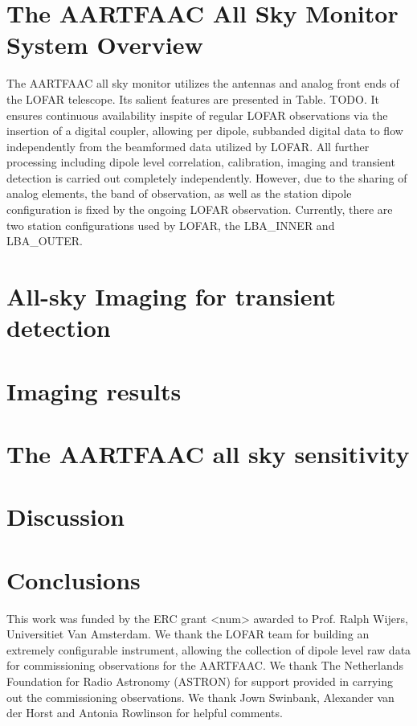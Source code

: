 \documentclass{aa}
\begin{document}
\section{\label{sec:The-AARTFAAC-All}The AARTFAAC All Sky Monitor System Overview}
 The AARTFAAC all sky monitor utilizes the antennas and analog front ends of the LOFAR telescope. Its salient features are presented in Table. TODO. It ensures continuous availability inspite of regular LOFAR observations via the insertion of a digital coupler, allowing per dipole, subbanded digital data to flow independently from the beamformed data utilized by LOFAR. All further processing including dipole level correlation, calibration, imaging and transient detection is carried out completely independently.
  However, due to the sharing of analog elements, the band of observation, as well as the station dipole configuration is fixed by the ongoing LOFAR observation. Currently, there are two station configurations used by LOFAR, the LBA\_INNER and LBA\_OUTER.

\section{\label{sec:All-sky-Imaging}All-sky Imaging for transient detection}

\section{\label{sec:Imaging-results}Imaging results}

\section{\label{sec:The-AARTFAAC-all-sky}The AARTFAAC all sky sensitivity}

\section{\label{sec:discussion}Discussion}

\section{\label{sec:conclusions}Conclusions}



\begin {acknowledgements}

This work  was funded  by the ERC  grant <num>  awarded to Prof.   Ralph Wijers,
Universitiet Van  Amsterdam. We thank the  LOFAR team for  building an extremely
configurable instrument,  allowing the collection  of dipole level raw  data for
commissioning observations for the AARTFAAC. We thank The Netherlands Foundation
for  Radio  Astronomy  (ASTRON)  for   support  provided  in  carrying  out  the
commissioning observations. We thank Jown  Swinbank, Alexander van der Horst and
Antonia Rowlinson for helpful comments.
\end{acknowledgements}


\end{document}
